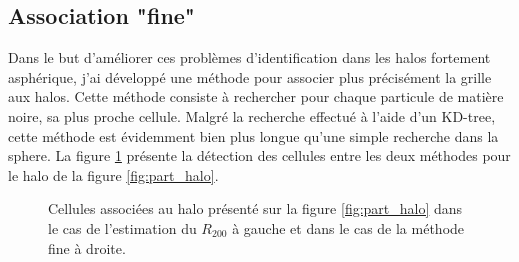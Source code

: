 \subsection{Association "fine"}

Dans le but d'améliorer ces problèmes d'identification dans les halos fortement asphérique, j'ai développé une méthode pour associer plus précisément la grille aux halos.
Cette méthode consiste à rechercher pour chaque particule de matière noire, sa plus proche cellule.
Malgré la recherche effectué à l'aide d'un KD-tree, cette méthode est évidemment bien plus longue qu'une simple recherche dans la sphere.
La figure \ref{fig:R200_fine} présente la détection des cellules entre les deux méthodes pour le halo de la figure \ref{fig:part_halo}.




\begin{figure}
    \caption[Méthodes d'association matière noire - grille]{Cellules associées au halo présenté sur la figure \ref{fig:part_halo} dans le cas de l'estimation du $R_{200}$ à gauche et dans le cas de la méthode fine à droite.       
 	\label{fig:R200_fine}}
\end{figure}


